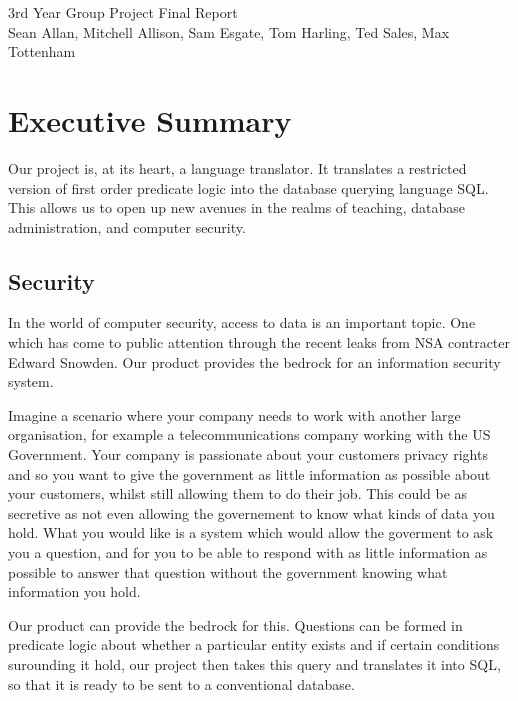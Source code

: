 \documentclass[a4paper, 11pt]{article}
\begin{document}
\begin{center}
  \huge 3rd Year Group Project Final Report \\ [0.4cm]
  \large Sean Allan, Mitchell Allison, Sam Esgate, Tom Harling, Ted Sales,
         Max Tottenham \\ [0.2cm]
  \vspace{0cm}
\end{center}

\tableofcontents
\clearpage

\section{Executive Summary}
  Our project is, at its heart, a language translator. It translates a
  restricted version of first order predicate logic into the database querying
  language SQL. This allows us to open up new avenues in the realms of
  teaching, database administration, and computer security.

  \subsection*{Security}
  In the world of computer security, access to data is an important topic. One
  which has come to public attention through the recent leaks from NSA
  contracter Edward Snowden. Our product provides the bedrock for an
  information security system. 

  Imagine a scenario where your company needs to work with another large
  organisation, for example a telecommunications company working with the US
  Government. Your company is passionate about your customers privacy rights
  and so you want to give the government as little information as possible
  about your customers, whilst still allowing them to do their job. This could
  be as secretive as not even allowing the governement to know what kinds of
  data you hold. What you would like is a system which would allow the
  goverment to ask you a question, and for you to be able to respond with as
  little information as possible to answer that question without the government
  knowing what information you hold.

  Our product can provide the bedrock for this. Questions can be formed in
  predicate logic about whether a particular entity exists and if certain
  conditions surounding it hold, our project then takes this query and
  translates it into SQL, so that it is ready to be sent to a conventional
  database.
\end{document}
